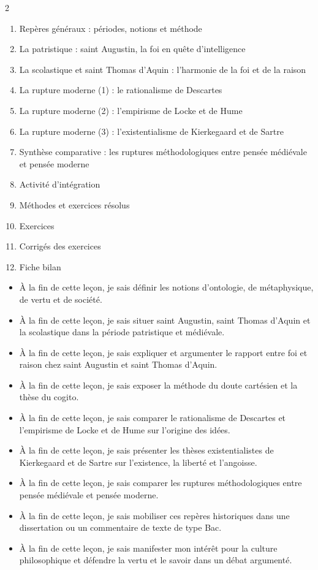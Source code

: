 \documentclass[11pt]{article}
\begin{document}
\begin{sommaire}
\begin{multicols}{2}
\begin{enumerate}
\item Repères généraux : périodes, notions et méthode
\item La patristique : saint Augustin, la foi en quête d'intelligence
\item La scolastique et saint Thomas d'Aquin : l'harmonie de la foi et de la raison
\item La rupture moderne (1) : le rationalisme de Descartes
\item La rupture moderne (2) : l'empirisme de Locke et de Hume
\item La rupture moderne (3) : l'existentialisme de Kierkegaard et de Sartre
\item Synthèse comparative : les ruptures méthodologiques entre pensée médiévale et pensée moderne
\item Activité d'intégration
\item Méthodes et exercices résolus
\item Exercices
\item Corrigés des exercices
\item Fiche bilan
\end{enumerate}
\end{multicols}
\end{sommaire}

\begin{objectifs}
\begin{itemize}
\item À la fin de cette leçon, je sais définir les notions d'ontologie, de métaphysique, de vertu et de société.
\item À la fin de cette leçon, je sais situer saint Augustin, saint Thomas d'Aquin et la scolastique dans la période patristique et médiévale.
\item À la fin de cette leçon, je sais expliquer et argumenter le rapport entre foi et raison chez saint Augustin et saint Thomas d'Aquin.
\item À la fin de cette leçon, je sais exposer la méthode du doute cartésien et la thèse du cogito.
\item À la fin de cette leçon, je sais comparer le rationalisme de Descartes et l'empirisme de Locke et de Hume sur l'origine des idées.
\item À la fin de cette leçon, je sais présenter les thèses existentialistes de Kierkegaard et de Sartre sur l'existence, la liberté et l'angoisse.
\item À la fin de cette leçon, je sais comparer les ruptures méthodologiques entre pensée médiévale et pensée moderne.
\item À la fin de cette leçon, je sais mobiliser ces repères historiques dans une dissertation ou un commentaire de texte de type Bac.
\item À la fin de cette leçon, je sais manifester mon intérêt pour la culture philosophique et défendre la vertu et le savoir dans un débat argumenté.
\end{itemize}
\end{objectifs}
\end{document}
